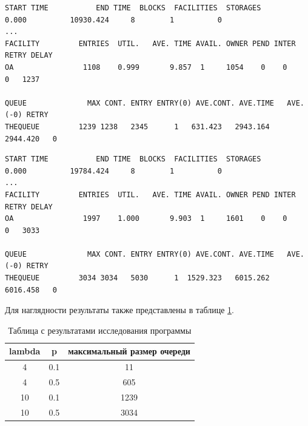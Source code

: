 \documentclass[14pt, a4paper]{extarticle}
\begin{document}
\begin{lstlisting}[caption = {Результат работы программы при $lambda\_value=10$ и $p\_reenter=0.1$ (максимальный размер очереди -- 1239)}, label=lst:3]
START TIME           END TIME  BLOCKS  FACILITIES  STORAGES
0.000          10930.424     8        1          0
...
FACILITY         ENTRIES  UTIL.   AVE. TIME AVAIL. OWNER PEND INTER RETRY DELAY
OA                1108    0.999       9.857  1     1054    0    0     0   1237

QUEUE              MAX CONT. ENTRY ENTRY(0) AVE.CONT. AVE.TIME   AVE.(-0) RETRY
THEQUEUE         1239 1238   2345      1   631.423   2943.164   2944.420   0
\end{lstlisting}


\begin{lstlisting}[caption = {Результат работы программы при $lambda\_value=10$ и $p\_reenter=0.5$ (максимальный размер очереди -- 3034)}, label=lst:4]
START TIME           END TIME  BLOCKS  FACILITIES  STORAGES
0.000          19784.424     8        1          0
...
FACILITY         ENTRIES  UTIL.   AVE. TIME AVAIL. OWNER PEND INTER RETRY DELAY
OA                1997    1.000       9.903  1     1601    0    0     0   3033

QUEUE              MAX CONT. ENTRY ENTRY(0) AVE.CONT. AVE.TIME   AVE.(-0) RETRY
THEQUEUE         3034 3034   5030      1  1529.323   6015.262   6016.458   0
\end{lstlisting}

Для наглядности результаты также представлены в таблице \ref{cmp}.



\begin{table}[]
		\begin{center}
		\captionsetup{justification=raggedleft,singlelinecheck=off}
		\caption{\label{cmp} Таблица с результатами исследования программы}
	\begin{tabular}{|c|c|c|}
		\hline
		lambda & p   & максимальный размер очереди \\ \hline
		4      & 0.1 & 11                          \\ \hline
		4      & 0.5 & 605                         \\ \hline
		10     & 0.1 & 1239                        \\ \hline
		10     & 0.5 & 3034                        \\ \hline
	\end{tabular}
\end{center}
\end{table}
\end{document}
